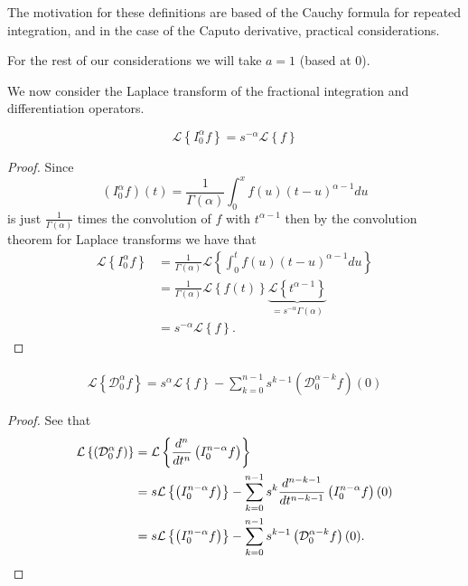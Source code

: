 \documentclass{article}
\begin{document}
The motivation for these definitions are based of the Cauchy formula for repeated integration, and in the case
of the Caputo derivative, practical considerations. \cite{Samko1993, Podlubny} 

For the rest of our considerations we will take $ a = 1 $ (based at 0). 

We now consider the Laplace transform of the fractional integration and differentiation operators.

\begin{lemma}
	$$
		\mathcal{L} \left\{ I_0^\alpha f \right\}  = s^{-\alpha} \mathcal{L} \left\{ f \right\}
	$$
\end{lemma}
\begin{proof}
	Since 
	$$
		 (I_0^\alpha f)(t) = \frac{1}{\Gamma(\alpha)} \int_0^x f(u) (t-u)^{\alpha - 1} du
	$$
	is just $ \frac{1}{\Gamma(\alpha)} $ times the convolution of $ f $ with $ t^{\alpha - 1} $ then by the convolution theorem
	for Laplace transforms we have that 
	\begin{align*}
		\mathcal{L} \left\{ I_0^\alpha f \right\} &= \frac{1}{\Gamma(\alpha)} \mathcal{L} \left\{ \int_{0}^{t} f(u) (t-u)^{\alpha - 1} du \right\} \\
			&= \frac{1}{\Gamma(\alpha)} \mathcal{L} \left\{ f(t) \right\} \underbrace{\mathcal{L} \left\{ t^{\alpha - 1} \right\}}_{=s^{-\alpha} \Gamma(\alpha)} \\
			&= s^{-\alpha} \mathcal{L} \left\{ f \right\}.
	\end{align*}
\end{proof}

\begin{lemma}
	\begin{align*}
		\mathcal{L} \left\{\mathcal{D}_0^\alpha f\right\} = s^\alpha \mathcal{L} \left\{ f \right\} - \sum_{k=0}^{n-1} s^{k-1} \left( \mathcal{D}_0^{\alpha-k} f\right)(0)
	\end{align*}
\end{lemma}
\begin{proof}
	See that
	\begin{align*}
		\mathcal{L} \left\{  \left( \mathcal{D}_{0}^{\alpha} f \right)  \right\} &= \mathcal{L} \left\{  \frac{d^{n}}{dt^{n}} \left( I_{0}^{n-\alpha} f \right)  \right\} \\
			&= s\mathcal{L} \left\{ \left( I_{0}^{n-\alpha} f \right) \right\} - \sum_{k=0}^{n-1} s^k \frac{d^{n-k-1}}{dt^{n-k-1}} \left( I_{0}^{n-\alpha} f \right)(0) \\
			&= s\mathcal{L} \left\{ \left( I_{0}^{n-\alpha} f \right) \right\} - \sum_{k=0}^{n-1} s^{k-1} \left( \mathcal{D}_{0}^{\alpha - k} f \right)(0). 
	\end{align*}
\end{proof}
\end{document}
